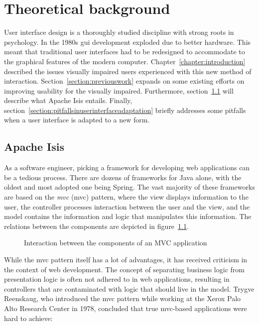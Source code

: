 \chapter{Theoretical background}
\label{chapter:theoreticalbackground}
User interface design is a thoroughly studied discipline with strong roots in psychology. In the 1980s \acrshort{gui} development exploded due to better hardware\cite{myers1998brief}. This meant that traditional user interfaces had to be redesigned to accommodate to the graphical features of the modern computer. Chapter~\ref{chapter:introduction} described the issues visually impaired users experienced with this new method of interaction. Section~\ref{section:previouswork} expands on some existing efforts on improving usability for the visually impaired. Furthermore, section~\ref{section:apacheisis} will describe what Apache Isis entails. Finally, section~\ref{section:pitfallsinuserinterfaceadaptation} briefly addresses some pitfalls when a user interface is adapted to a new form.

\section{Apache Isis}
\label{section:apacheisis}
As a software engineer, picking a framework for developing web applications can be a tedious process. There are dozens of frameworks for Java alone, with the oldest and most adopted one being Spring\cite{Sprin96:online}. The vast majority of these frameworks are based on the \textit{\acrlong{mvc}} (\acrshort{mvc}) pattern, where the view displays information to the user, the controller processes interaction between the user and the view, and the model contains the information and logic that manipulates this information\cite{leff2001web}. The relations between the components are depicted in figure~\ref{figure:mvc}.

\begin{figure}[h]
	\center
	
	\caption{Interaction between the components of an MVC application}
	\label{figure:mvc}
\end{figure}

While the \acrshort{mvc} pattern itself has a lot of advantages, it has received criticism in the context of web development. The concept of separating business logic from presentation logic is often not adhered to in web applications, resulting in controllers that are contaminated with logic that should live in the model\cite{Fulfi2:online}. Trygve Reenskaug, who introduced the \acrshort{mvc} pattern while working at the Xerox Palo Alto Research Center in 1978, concluded that true \acrshort{mvc}-based applications were hard to achieve\cite{reenskaug2007programming}:

